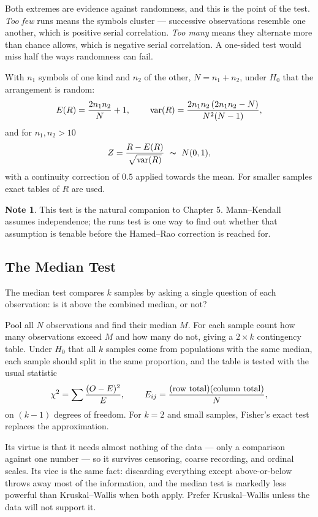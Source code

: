 \documentclass[11pt,a4paper]{article}
\theoremstyle{definition}
\newtheorem{note}[thm]{Note}
\begin{document}
Both extremes are evidence against randomness, and this is the point of the
test. \emph{Too few} runs means the symbols cluster --- successive observations
resemble one another, which is positive serial correlation. \emph{Too many} means
they alternate more than chance allows, which is negative serial correlation. A
one-sided test would miss half the ways randomness can fail.

With $n_1$ symbols of one kind and $n_2$ of the other, $N = n_1 + n_2$, under
$H_0$ that the arrangement is random:
$$E(R) = \dfrac{2n_1n_2}{N} + 1, \hspace{0.8cm}
\operatorname{var}(R) = \dfrac{2n_1n_2\left(2n_1n_2 - N\right)}{N^{2}(N-1)},$$
and for $n_1, n_2 > 10$
$$Z = \dfrac{R - E(R)}{\sqrt{\operatorname{var}(R)}}\ \thicksim\ N(0,1),$$
with a continuity correction of $0.5$ applied towards the mean. For smaller
samples exact tables of $R$ are used.

\begin{note}
This test is the natural companion to Chapter 5. Mann--Kendall assumes
independence; the runs test is one way to find out whether that assumption is
tenable before the Hamed--Rao correction is reached for.
\end{note}

\subsection{The Median Test}

The median test compares $k$ samples by asking a single question of each
observation: is it above the combined median, or not?

Pool all $N$ observations and find their median $M$. For each sample count how
many observations exceed $M$ and how many do not, giving a $2 \times k$
contingency table. Under $H_0$ that all $k$ samples come from populations with
the same median, each sample should split in the same proportion, and the table
is tested with the usual statistic
$$\chi^{2} = \sum \dfrac{(O - E)^{2}}{E},
\hspace{0.8cm} E_{ij} = \dfrac{(\text{row total})(\text{column total})}{N},$$
on $(k-1)$ degrees of freedom. For $k = 2$ and small samples, Fisher's exact test
replaces the approximation.

Its virtue is that it needs almost nothing of the data --- only a comparison
against one number --- so it survives censoring, coarse recording, and ordinal
scales. Its vice is the same fact: discarding everything except above-or-below
throws away most of the information, and the median test is markedly less
powerful than Kruskal--Wallis when both apply. Prefer Kruskal--Wallis unless the
data will not support it.
\end{document}

